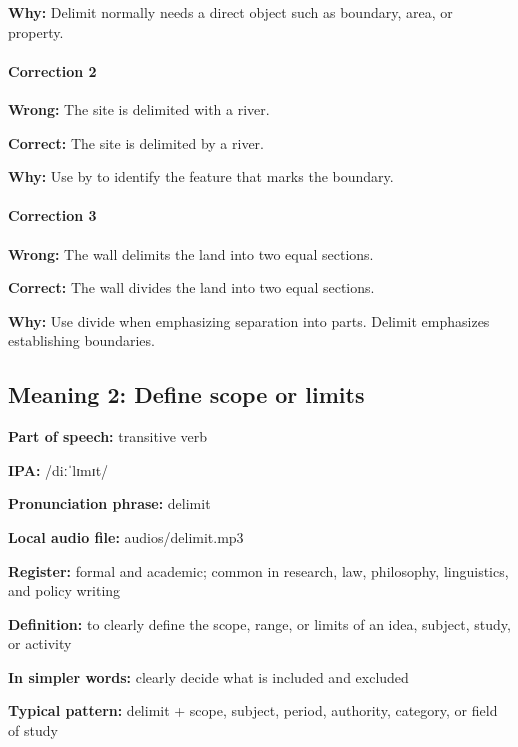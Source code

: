 \documentclass[11pt]{article}
\begin{document}
\textbf{Why:} Delimit normally needs a direct object such as boundary, area, or property.

\paragraph{Correction 2}
\textbf{Wrong:} The site is delimited with a river.

\textbf{Correct:} The site is delimited by a river.

\textbf{Why:} Use by to identify the feature that marks the boundary.

\paragraph{Correction 3}
\textbf{Wrong:} The wall delimits the land into two equal sections.

\textbf{Correct:} The wall divides the land into two equal sections.

\textbf{Why:} Use divide when emphasizing separation into parts. Delimit emphasizes establishing boundaries.

\subsection{Meaning 2: Define scope or limits}
\textbf{Part of speech:} transitive verb

\textbf{IPA:} /diːˈlɪmɪt/

\textbf{Pronunciation phrase:} delimit

\textbf{Local audio file:} audios/delimit.mp3

\textbf{Register:} formal and academic; common in research, law, philosophy, linguistics, and policy writing

\textbf{Definition:} to clearly define the scope, range, or limits of an idea, subject, study, or activity

\textbf{In simpler words:} clearly decide what is included and excluded

\textbf{Typical pattern:} delimit + scope, subject, period, authority, category, or field of study
\end{document}
